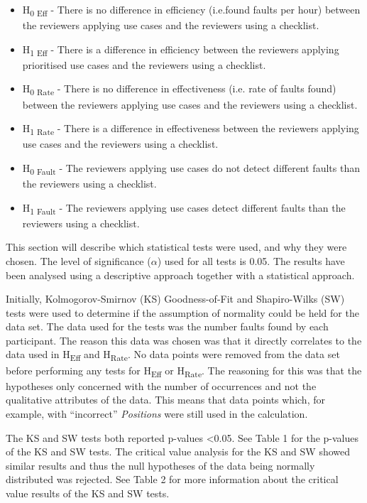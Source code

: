 \documentclass[10pt,twocolumn]{article}
\begin{document}
\begin{itemize}
\item H\textsubscript{0 Eff} - There is no difference in efficiency (i.e.found faults per hour) between the reviewers applying use cases and the reviewers using a checklist.
\item H\textsubscript{1 Eff} - There is a difference in efficiency between the reviewers applying prioritised use cases and the reviewers using a checklist.
\item H\textsubscript{0 Rate} - There is no difference in effectiveness (i.e. rate of faults found) between the reviewers applying use cases and the reviewers using a checklist.
\item H\textsubscript{1 Rate} - There is a difference in effectiveness between the reviewers applying use cases and the reviewers using a checklist.
\item H\textsubscript{0 Fault} - The reviewers applying use cases do not detect different faults than the reviewers using a checklist.
\item H\textsubscript{1 Fault} - The reviewers applying use cases detect different faults than the reviewers using a checklist.

\end{itemize}

This section will describe which statistical tests were used, and why they were chosen. The level of significance ($\alpha$) used for all tests is 0.05. The results have been analysed using a descriptive approach together with a statistical approach.

Initially, Kolmogorov-Smirnov (KS) Goodness-of-Fit and Shapiro-Wilks (SW) tests were used to determine if the assumption of normality could be held for the data set. The data used for the tests was the number faults found by each participant. The reason this data was chosen was that it directly correlates to the data used in H\textsubscript{Eff} and H\textsubscript{Rate}. No data points were removed from the data set before performing any tests for H\textsubscript{Eff} or H\textsubscript{Rate}. The reasoning for this was that the hypotheses only concerned with the number of occurrences and not the qualitative attributes of the data. This means that data points which, for example, with ``incorrect'' \textit{Positions} were still used in the calculation.

The KS and SW tests both reported p-values \textless 0.05. See Table 1 for the p-values of the KS and SW tests. The critical value analysis for the KS and SW showed similar results and thus the null hypotheses of the data being normally distributed was rejected. See Table 2 for more information about the critical value results of the KS and SW tests.
\end{document}
